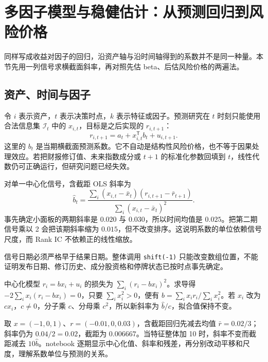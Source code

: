 \chapter{多因子模型与稳健估计：从预测回归到风险价格}
\label{ch:lower-multifactor-model}

\begin{itemize}
  
\end{itemize}

同样写成收益对因子的回归，沿资产轴与沿时间轴得到的系数并不是同一种量。本节先用一列信号求横截面斜率，再对照先估 beta、后估风险价格的两遍法。


\section{资产、时间与因子}

令 $i$ 表示资产，$t$ 表示决策时点，$k$ 表示特征或因子。预测研究在 $t$ 时刻只能使用合法信息集 $\mathcal I_t$ 中的 $x_{i,t}$，目标是之后实现的 $r_{i,t+1}$：
\[
r_{i,t+1}=a_t+x_{i,t}^{\mathsf T}b_t+u_{i,t+1}.
\]
这里的 $b_t$ 是当期横截面预测系数。它不自动是结构性风险价格，也不等于因果处理效应。若把财报修订值、未来指数成分或 $t+1$ 的标准化参数回填到 $t$，线性代数仍可正确运行，但研究问题已经失效。



对单一中心化信号，含截距 OLS 斜率为
\[
\hat b_t=\frac{\sum_i(x_{i,t}-\bar x_t)(r_{i,t+1}-\bar r_{t+1})}
{\sum_i(x_{i,t}-\bar x_t)^2}.
\]
事先确定小面板的两期斜率是 $0.020$ 与 $0.030$，所以时间均值是 $0.025$。把第二期信号乘以 2 会把该期斜率缩为 $0.015$，但不改变排序。这说明系数的单位依赖信号尺度，而 Rank IC 不依赖正的线性缩放。

\begin{diagnostic}
信号日期必须严格早于结果日期。整体调用 \texttt{shift(-1)} 只能改变数组位置，不能证明发布日期、修订历史、成分股资格和停牌状态已按时点事先确定。
\end{diagnostic}


中心化模型 $r_i=b x_i+u_i$ 的损失为 $\sum_i(r_i-bx_i)^2$。求导得 $-2\sum_i x_i(r_i-bx_i)=0$，只要 $\sum_i x_i^2>0$，便有 $\hat b=\sum_i x_ir_i/\sum_i x_i^2$。若 $x_i$ 改为 $c x_i$，$c\ne0$，分子乘 $c$、分母乘 $c^2$，所以新斜率为 $\hat b/c$，拟合值保持不变。

取 $x=(-1,0,1)$、$r=(-0.01,0,0.03)$，含截距回归先减去均值 $\bar r=0.02/3$；斜率仍为 $0.04/2=0.02$，截距为 $0.006667$。当特征整体加 10 时，斜率不变而截距减去 $10\hat b$。notebook 逐期显示中心化值、斜率和残差，再分别改动平移和尺度，理解系数单位与预测的关系。

